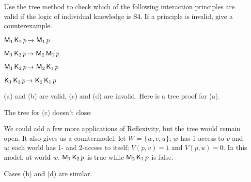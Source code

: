 \begin{exercise}
  Use the tree method to check which of the following interaction principles are
  valid if the logic of individual knowledge is S4. If a principle is invalid,
  give a counterexample.
  \begin{exlist}
  \item $\Mi_1 \Kn_2 p \to \Mi_1 p$ 
  \item $\Mi_1 \Kn_2 p \to \Mi_2\Mi_1 p$
  \item $\Mi_1 \Kn_2 p \to \Mi_2\Kn_1 p$
  \item $\Kn_1\Kn_2 p \to \Kn_2\Kn_1 p$
  \end{exlist}
\end{exercise}
\begin{solution}
  (a) and (b) are valid, (c) and (d) are invalid. Here is a tree proof for (a).
  
  \bigskip
  \begin{center}
  \end{center}

  The tree for (c) doesn't close:
  
  \bigskip
  \begin{center}
  \end{center}
  We could add a few more applications of Reflexivity, but the tree would remain
  open. It also gives us a countermodel: let $W$ = $\{ w,v,u \}$; $w$ has
  1-access to $v$ and $u$; each world has 1- and 2-access to itself;
  $V(p,v) = 1$ and $V(p,u) = 0$. In this model, at world $w$, $\operatorname{\mathsf{M}}_1\operatorname{\mathsf{K}{}}_2 p$ is
  true while $\operatorname{\mathsf{M}}_2\operatorname{\mathsf{K}{}}_1 p$ is false.

  Cases (b) and (d) are similar.
  
\end{solution}

